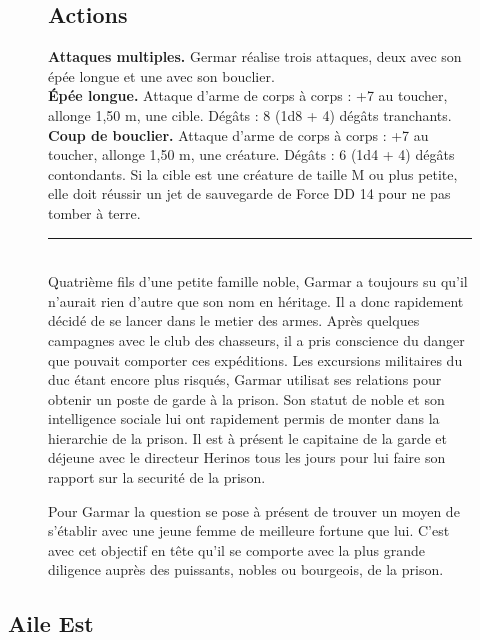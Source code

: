 \begin{figure}[btp]
{\begin{minipage}[c]{\linewidth}
    \subsection*{Actions}
    {\bfseries Attaques multiples.} Germar réalise trois attaques, deux avec son épée longue et une
               avec son bouclier.\\
    {\bfseries Épée longue.} Attaque d'arme de corps à corps : +7 au toucher, allonge 1,50 m, 
               une cible. Dégâts : 8 (1d8 + 4) dégâts tranchants. \\
    {\bfseries Coup de bouclier.} Attaque d'arme de corps à corps : +7 au toucher, allonge 1,50 m, 
               une créature. Dégâts : 6 (1d4 + 4) dégâts contondants. Si la cible est une créature de 
               taille M ou plus petite, elle doit réussir un jet de sauvegarde de Force DD 14 pour ne 
               pas tomber à terre.\\
    \noindent\rule{\textwidth}{1pt} \\
Quatrième fils d'une petite famille noble, Garmar a toujours su qu'il n'aurait 
rien d'autre que son nom en héritage. Il a donc rapidement décidé de se lancer 
dans le metier des armes. Après quelques
campagnes avec le club des chasseurs, il a pris conscience du danger que pouvait 
comporter ces expéditions. Les excursions militaires du duc étant encore plus
risqués, Garmar utilisat ses relations pour obtenir un poste de garde à la prison.
Son statut de noble et son intelligence sociale lui ont rapidement permis de 
monter dans la hierarchie de la prison. Il est à présent le capitaine de la
garde et déjeune avec le directeur Herinos tous les jours pour lui faire son
rapport sur la securité de la prison.

Pour Garmar la question se pose à présent de trouver un moyen de s'établir
avec une jeune femme de meilleure fortune que lui.
C'est avec cet objectif en tête qu'il se comporte avec la plus grande 
diligence auprès des puissants, nobles ou bourgeois, de la prison.
 \end{minipage}
}%
\end{figure}


\subsection{Aile Est}

